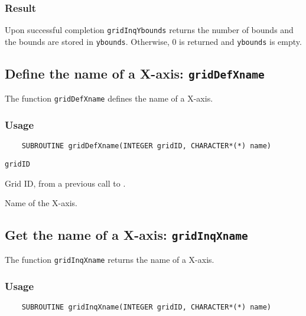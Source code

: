 \subsubsection*{Result}

Upon successful completion {\tt gridInqYbounds} returns the number of bounds and
the bounds are stored in {\tt ybounds}.
Otherwise, 0 is returned and {\tt ybounds} is empty.



\subsection{Define the name of a X-axis: {\tt gridDefXname}}
\label{gridDefXname}

The function {\tt gridDefXname} defines the name of a X-axis.

\subsubsection*{Usage}

\begin{verbatim}
    SUBROUTINE gridDefXname(INTEGER gridID, CHARACTER*(*) name)
\end{verbatim}

\hspace*{4mm}\begin{minipage}[]{15cm}
\begin{deflist}{\tt gridID\ }
\item[{\tt gridID}]
Grid ID, from a previous call to {}.
\item[{\tt name}]
Name of the X-axis.

\end{deflist}
\end{minipage}


\subsection{Get the name of a X-axis: {\tt gridInqXname}}
\label{gridInqXname}

The function {\tt gridInqXname} returns the name of a X-axis.

\subsubsection*{Usage}

\begin{verbatim}
    SUBROUTINE gridInqXname(INTEGER gridID, CHARACTER*(*) name)
\end{verbatim}

